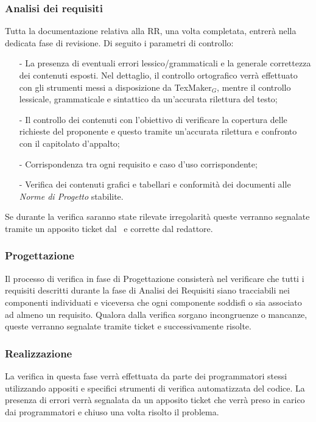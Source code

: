 \subsubsection{Analisi dei requisiti}
Tutta la documentazione relativa alla RR, una volta completata, entrerà nella dedicata fase di revisione. Di seguito i parametri di controllo:
\begin{itemize}
	\item[-] La presenza di eventuali errori lessico/grammaticali e la generale correttezza dei contenuti esposti. Nel dettaglio, il controllo ortografico verrà effettuato con gli strumenti messi a disposizione da TexMaker$_G$, mentre il controllo lessicale, grammaticale e sintattico da un'accurata rilettura del testo;
	\item[-]Il controllo dei contenuti con l'obiettivo di verificare la copertura delle richieste del proponente e questo tramite un'accurata rilettura e confronto con il capitolato d'appalto;
	\item[-]Corrispondenza tra ogni requisito e caso d'uso corrispondente;
	\item[-]Verifica dei contenuti grafici e tabellari e conformità dei documenti alle \textit{Norme di Progetto} stabilite.
\end{itemize}
Se durante la verifica saranno state rilevate irregolarità
queste verranno segnalate tramite un apposito ticket dal \ruoloVerificatore\
e corrette dal redattore.

\subsubsection{Progettazione}
Il processo di verifica in fase di Progettazione consisterà nel verificare che tutti i requisiti descritti durante la fase di Analisi dei Requisiti siano tracciabili nei componenti individuati e viceversa che ogni componente soddisfi o sia associato ad almeno un requisito. Qualora dalla verifica sorgano incongruenze o mancanze, queste verranno segnalate tramite ticket e successivamente risolte.

\subsubsection{Realizzazione}
La verifica in questa fase verrà effettuata da parte
dei programmatori stessi utilizzando appositi e specifici strumenti di
verifica automatizzata del codice. La presenza di errori verrà segnalata da
un apposito ticket che verrà preso in carico dai programmatori e chiuso
una volta risolto il problema.

